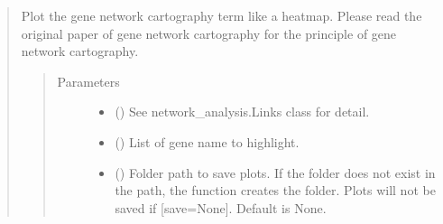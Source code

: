 \documentclass[letterpaper,10pt,english]{sphinxmanual}
\begin{document}
\begin{quote}
\begin{fulllineitems}
\begin{fulllineitems}
\label{\detokenize{modules/celloracle.network_analysis:celloracle.network_analysis.Links.plot_cartography_term}}
Plot the gene network cartography term like a heatmap.
Please read the original paper of gene network cartography for the principle of gene network cartography.
\begin{quote}\begin{description}
\item[{Parameters}] \leavevmode\begin{itemize}
\item {} 
 ({\hyperref[\detokenize{modules/celloracle:celloracle.Links}]{}}) \textendash{} See network\_analysis.Links class for detail.

\item {} 
 () \textendash{} List of gene name to highlight.

\item {} 
 () \textendash{} Folder path to save plots. If the folder does not exist in the path, the function creates the folder.
Plots will not be saved if {[}save=None{]}. Default is None.

\end{itemize}

\end{description}\end{quote}

\end{fulllineitems}



\end{fulllineitems}
\end{quote}
\end{document}
